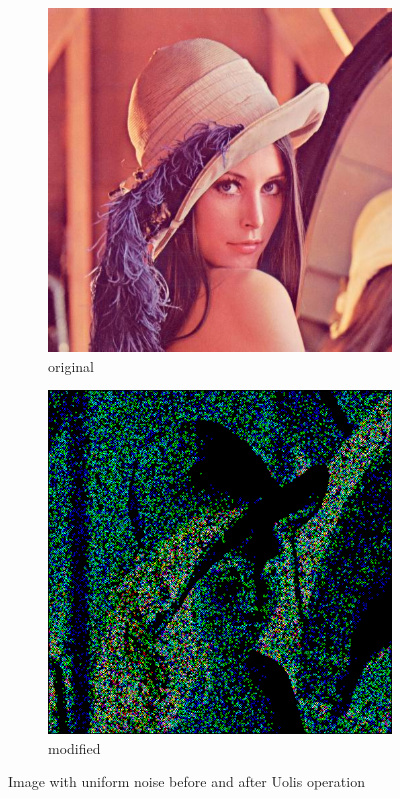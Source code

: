 \documentclass[12pt]{article}
\begin{document}
\begin{figure}[H]\centering
    \begin{subfigure}[t]{\subfiguresize}\centering
        \includegraphics[width=\textwidth]{lenac.png}
        \caption{original}
    \end{subfigure}
    \hspace{.05\textwidth}
    \begin{subfigure}[t]{\subfiguresize}\centering
        \includegraphics[width=\textwidth]{lena_uolis_uniform.png}
        \caption{modified}
    \end{subfigure}
    \caption{Image with uniform noise before and after Uolis operation}
\end{figure}
\end{document}
